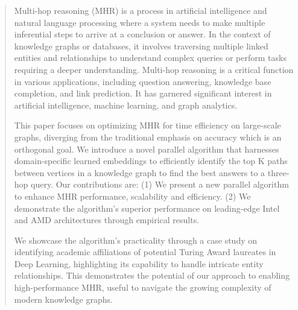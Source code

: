 \documentclass[sigconf]{acmart}
\begin{document}
\begin{abstract}
Multi-hop reasoning (MHR) is a process in artificial intelligence and natural language processing where a system needs to make multiple inferential steps to arrive at a conclusion or answer. In the context of knowledge graphs or databases, it involves traversing multiple linked entities and relationships to understand complex queries or perform tasks requiring a deeper understanding. Multi-hop reasoning is a critical function in various applications, including question answering, knowledge base completion, and link prediction. It has garnered significant interest in artificial intelligence, machine learning, and graph analytics. 

This paper focuses on optimizing MHR for time efficiency on large-scale graphs, diverging from the traditional emphasis on accuracy which is an orthogonal goal. We introduce a novel parallel algorithm that harnesses domain-specific learned embeddings to efficiently identify the top K paths between vertices in a knowledge graph to find the best answers to a three-hop query. Our contributions are: (1) We present a new parallel algorithm to enhance MHR performance, scalability and efficiency. (2) We demonstrate the algorithm's superior performance on leading-edge Intel and AMD architectures through empirical results.

We showcase the algorithm's practicality through a case study on identifying academic affiliations of potential Turing Award laureates in Deep Learning, highlighting its capability to handle intricate entity relationships. This demonstrates the potential of our approach to enabling high-performance MHR, useful to navigate the growing complexity of modern knowledge graphs.

\end{abstract}


\maketitle
\end{document}
